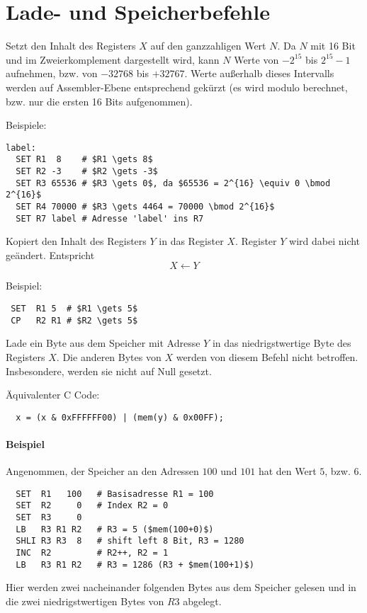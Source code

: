 \section{Lade- und Speicherbefehle}
\label{sec:Lade-Speicher-Instruktionen}

Setzt den Inhalt des Registers $X$ auf den ganzzahligen Wert $N$.
Da $N$ mit 16 Bit und im Zweierkomplement dargestellt wird, kann $N$ Werte von
$-2^{15}$ bis $2^{15} - 1$ aufnehmen, bzw. von $-32768$ bis $+32767$.
Werte außerhalb dieses Intervalls werden auf Assembler-Ebene entsprechend
gekürzt (es wird modulo berechnet, bzw. nur die ersten 16 Bits aufgenommen).

Beispiele:
\begin{lstlisting}
label:
  SET R1  8    # $R1 \gets 8$
  SET R2 -3    # $R2 \gets -3$
  SET R3 65536 # $R3 \gets 0$, da $65536 = 2^{16} \equiv 0 \bmod 2^{16}$
  SET R4 70000 # $R3 \gets 4464 = 70000 \bmod 2^{16}$
  SET R7 label # Adresse 'label' ins R7
\end{lstlisting}


Kopiert den Inhalt des Registers $Y$ in das Register $X$. Register $Y$ wird
dabei nicht geändert. Entspricht
\[
    X \gets Y
\]

Beispiel:
\begin{lstlisting}
 SET  R1 5  # $R1 \gets 5$
 CP   R2 R1 # $R2 \gets 5$
\end{lstlisting}



Lade ein Byte aus dem Speicher mit Adresse $Y$ in das niedrigstwertige
Byte des Registers $X$. Die anderen Bytes von $X$ werden von diesem Befehl nicht
betroffen. Insbesondere, werden sie nicht auf Null gesetzt.

Äquivalenter C Code:
\begin{lstlisting}
  x = (x & 0xFFFFFF00) | (mem(y) & 0x00FF);
\end{lstlisting}

\paragraph{Beispiel}
Angenommen, der Speicher an den Adressen $100$ und $101$ hat den Wert $5$,
bzw. $6$.
\begin{lstlisting}
  SET  R1   100   # Basisadresse R1 = 100
  SET  R2     0   # Index R2 = 0
  SET  R3     0
  LB   R3 R1 R2   # R3 = 5 ($mem(100+0)$)
  SHLI R3 R3  8   # shift left 8 Bit, R3 = 1280
  INC  R2         # R2++, R2 = 1
  LB   R3 R1 R2   # R3 = 1286 (R3 + $mem(100+1)$)
\end{lstlisting}
Hier werden zwei nacheinander folgenden Bytes aus dem Speicher gelesen und in
die zwei niedrigstwertigen Bytes von $R3$ abgelegt.



